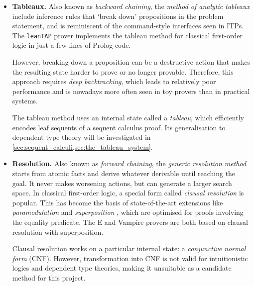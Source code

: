 \documentclass[twoside]{report}
\begin{document}
\begin{itemize}
    \item \textbf{Tableaux.} Also known as \emph{backward chaining}, the \emph{method of analytic tableaux} \cite{smullyan1968first} include inference rules that `break down' propositions in the problem statement, and is reminiscent of the command-style interfaces seen in ITPs. The \texttt{leanTAP} prover \cite{beckert1995leantap} implements the tableau method for classical first-order logic in just a few lines of Prolog code.
    
    However, breaking down a proposition can be a destructive action that makes the resulting state harder to prove or no longer provable. Therefore, this approach requires \emph{deep backtracking}, which leads to relatively poor performance and is nowadays more often seen in toy provers than in practical systems.

    The tableau method uses an internal state called a \emph{tableau}, which efficiently encodes leaf sequents of a sequent calculus proof. Its generalisation to dependent type theory will be investigated in \cref{sec:sequent_calculi,sec:the_tableau_system}.
    
    \item \textbf{Resolution.} Also known as \emph{forward chaining}, the \emph{generic resolution method} \cite{mints1988gentzen,tammet1997resolution} starts from atomic facts and derive whatever derivable until reaching the goal. It never makes worsening actions, but can generate a larger search space. %
    In classical first-order logic, a special form called \emph{clausal resolution} \cite{robinson1965machine} is popular. This has become the basis of state-of-the-art extensions like \emph{paramodulation} \cite{robinson1983paramodulation} and \emph{superposition} \cite{bachmair1994rewrite}, which are optimised for proofs involving the equality predicate. The E \cite{schulz2019faster} and Vampire \cite{kovacs2013first} provers are both based on clausal resolution with superposition.
    
    Clausal resolution works on a particular internal state: a \emph{conjunctive normal form} (CNF). However, transformation into CNF is not valid for intuitionistic logics and dependent type theories, making it unsuitable as a candidate method for this project.
    

\end{itemize}
\end{document}
